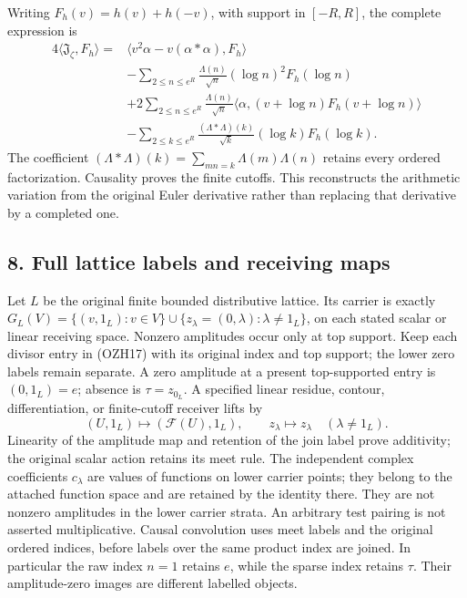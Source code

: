 \documentclass[
  10pt,
  a4paper,
]{article}
\begin{document}
Writing \(F_h(v)=h(v)+h(-v)\), with support in \([-R,R]\), the complete
expression is \[
\begin{aligned}
4\langle\mathfrak J_\zeta,F_h\rangle={}&
\langle v^2\alpha-v(\alpha*\alpha),F_h\rangle\\
&-\sum_{2\le n\le e^R}\frac{\Lambda(n)}{\sqrt n}
(\log n)^2F_h(\log n)\\
&+2\sum_{2\le n\le e^R}\frac{\Lambda(n)}{\sqrt n}
\langle\alpha,(v+\log n)F_h(v+\log n)\rangle\\
&-\sum_{2\le k\le e^R}\frac{(\Lambda*\Lambda)(k)}{\sqrt k}
(\log k)F_h(\log k).
\end{aligned}\tag{OZH45}
\] The coefficient
\((\Lambda*\Lambda)(k)=\sum_{mn=k}\Lambda(m)\Lambda(n)\) retains every
ordered factorization. Causality proves the finite cutoffs. This
reconstructs the arithmetic variation from the original Euler derivative
rather than replacing that derivative by a completed one.

\subsection{8. Full lattice labels and receiving
maps}\label{full-lattice-labels-and-receiving-maps}

Let \(L\) be the original finite bounded distributive lattice. Its
carrier is exactly
\(G_L(V)=\{(v,1_L):v\in V\}\cup\{z_\lambda=(0,\lambda):\lambda\ne1_L\}\),
on each stated scalar or linear receiving space. Nonzero amplitudes
occur only at top support. Keep each divisor entry in (OZH17) with its
original index and top support; the lower zero labels remain separate. A
zero amplitude at a present top-supported entry is \((0,1_L)=e\);
absence is \(\tau=z_{0_L}\). A specified linear residue, contour,
differentiation, or finite-cutoff receiver lifts by \[
(U,1_L)\longmapsto(\mathcal F(U),1_L),\qquad
z_\lambda\longmapsto z_\lambda\quad(\lambda\ne1_L).
\tag{OZH46}
\] Linearity of the amplitude map and retention of the join label prove
additivity; the original scalar action retains its meet rule. The
independent complex coefficients \(c_\lambda\) are values of functions
on lower carrier points; they belong to the attached function space and
are retained by the identity there. They are not nonzero amplitudes in
the lower carrier strata. An arbitrary test pairing is not asserted
multiplicative. Causal convolution uses meet labels and the original
ordered indices, before labels over the same product index are joined.
In particular the raw index \(n=1\) retains \(e\), while the sparse
index retains \(\tau\). Their amplitude-zero images are different
labelled objects.
\end{document}
